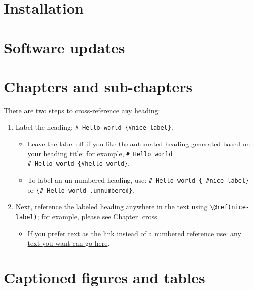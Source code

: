 \documentclass[
]{book}
\providecommand{\tightlist}{%
  \setlength{\itemsep}{0pt}\setlength{\parskip}{0pt}}
\theoremstyle{definition}
\theoremstyle{definition}
\theoremstyle{definition}
\theoremstyle{definition}
\theoremstyle{remark}
\begin{document}
\hypertarget{installation}{%
\section{Installation}\label{installation}}

\hypertarget{software-updates}{%
\section{Software updates}\label{software-updates}}

\hypertarget{chapters-and-sub-chapters}{%
\section{Chapters and sub-chapters}\label{chapters-and-sub-chapters}}

There are two steps to cross-reference any heading:

\begin{enumerate}
\def\labelenumi{\arabic{enumi}.}
\tightlist
\item
  Label the heading: \texttt{\#\ Hello\ world\ \{\#nice-label\}}.

  \begin{itemize}
  \tightlist
  \item
    Leave the label off if you like the automated heading generated based on your heading title: for example, \texttt{\#\ Hello\ world} = \texttt{\#\ Hello\ world\ \{\#hello-world\}}.
  \item
    To label an un-numbered heading, use: \texttt{\#\ Hello\ world\ \{-\#nice-label\}} or \texttt{\{\#\ Hello\ world\ .unnumbered\}}.
  \end{itemize}
\item
  Next, reference the labeled heading anywhere in the text using \texttt{\textbackslash{}@ref(nice-label)}; for example, please see Chapter \ref{cross}.

  \begin{itemize}
  \tightlist
  \item
    If you prefer text as the link instead of a numbered reference use: \protect\hyperlink{cross}{any text you want can go here}.
  \end{itemize}
\end{enumerate}

\hypertarget{captioned-figures-and-tables}{%
\section{Captioned figures and tables}\label{captioned-figures-and-tables}}
\end{document}
